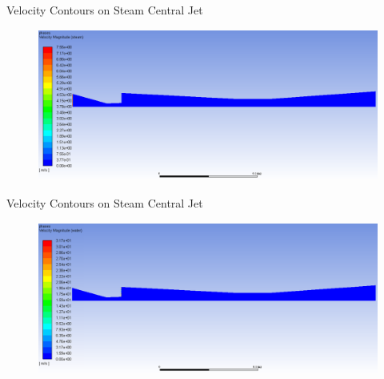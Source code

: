 \begin{frame}{Velocity Contours on Steam Central Jet}
    \begin{figure}
        \centering
        \includegraphics[height=5cm]{images/sjcentralsteamvel.png}
    \end{figure}
\end{frame}

\begin{frame}{Velocity Contours on Steam Central Jet}
    \begin{figure}
        \centering
        \includegraphics[height=5cm]{images/sjcentralwatervel.png}
    \end{figure}
\end{frame}

